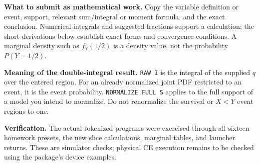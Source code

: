 \textbf{What to submit as mathematical work.} Copy the variable definition or event, support, relevant sum/integral or moment formula, and the exact conclusion. Numerical integrals and suggested fractions support a calculation; the short derivations below establish exact forms and convergence conditions. A marginal density such as $f_Y(1/2)$ is a density value, not the probability $P(Y=1/2)$.

\textbf{Meaning of the double-integral result.} \texttt{RAW I} is the integral of the supplied $q$ over the entered region. For an already normalized joint PDF restricted to an event, it is the event probability. \texttt{NORMALIZE FULL S} applies to the full support of a model you intend to normalize. Do not renormalize the survival or $X<Y$ event regions to one.

\textbf{Verification.} The actual tokenized programs were exercised through all sixteen homework presets, the new slice calculations, marginal tables, and launcher returns. These are simulator checks; physical CE execution remains to be checked using the package's device examples.
